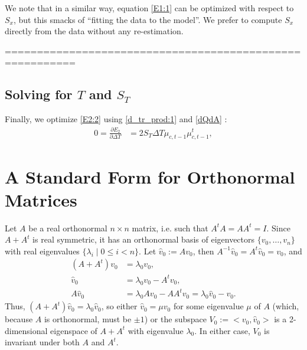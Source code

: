 \documentclass[12pt,leqno]{article}
\begin{document}
We note that in a similar way, equation \eqref{E1:1} can be optimized with respect to $S_x$, but this smacks of
``fitting the data to the model''.  We prefer to compute $S_x$ directly from the data without any re-estimation.

=========================================================
 
    
\subsection{Solving for $T$ and $S_T$}
Finally, we optimize \eqref{E2:2} using \eqref{d_tr_prod:1} and \eqref{dQdA} :
\begin{align*}
  0 = \frac{\partial{E_2}}{\partial{\Delta{T}}} &= 2S_T\Delta{T}\mu_{c,t-1}\mu_{c,t-1}^t,
\end{align*}
\newpage


\appendix
\section{A Standard Form for Orthonormal Matrices}\label{ortho_std_form}
Let $A$ be a real orthonormal $n\times n$ matrix, i.e. such that $A^tA = AA^t = I$.  Since $A+A^t$ is real
symmetric, it has an  orthonormal basis of eigenvectors    $\{v_0,\dots,v_n\}$ with
real eigenvalues $\{\lambda_i \mid 0\le i < n\}$.
Let $\hat{v}_0 := Av_0$, then $A^{-1} \hat{v}_0 = A^t\hat{v}_0 = v_0$, and 
\begin{align*}
  (A + A^t)v_0 &= \lambda_0 v_0,\\
  \hat{v}_0 & = \lambda_0 v_0 - A^tv_0, \\
  A\hat{v}_0 &= \lambda_0 Av_0 - AA^tv_0 = \lambda_0 \hat{v}_0 - v_0.
\end{align*}
Thus, $(A+A^t)\hat{v}_0 = \lambda_0 \hat{v}_0$, so either $\hat{v}_0 = \mu v_0$ for some eigenvalue $\mu$ of $A$ (which, because $A$ is orthonormal, must be $\pm 1$) or the subspace $V_0:= <v_0,\hat{v}_0>$ is a 2-dimensional eigenspace of $A+A^t$ with eigenvalue $\lambda_0$.  In either case, $V_0$  is invariant under both $A$ and $A^t$.
\end{document}
